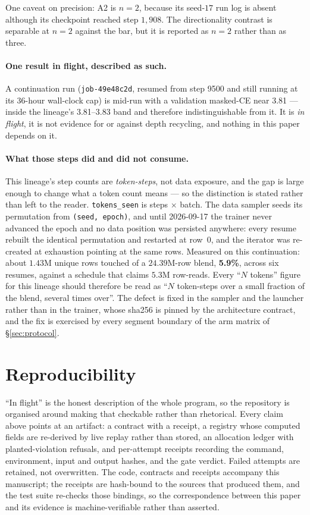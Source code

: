 \documentclass[11pt]{article}
\begin{document}
One caveat on precision: A2 is $n = 2$, because its seed-$17$ run log is absent although its
checkpoint reached step $1{,}908$. The directionality contrast is separable at $n = 2$
against the bar, but it is reported as $n = 2$ rather than as three.

\paragraph{One result in flight, described as such.} A continuation run
(\texttt{job-49e48c2d}, resumed from step 9500 and still running at its 36-hour
wall-clock cap) is mid-run with a validation masked-CE near 3.81 --- inside the lineage's
3.81--3.83 band and therefore indistinguishable from it. It is \emph{in flight}, it is
not evidence for or against depth recycling, and nothing in this paper depends on it.

\paragraph{What those steps did and did not consume.} This lineage's step counts are
\emph{token-steps}, not data exposure, and the gap is large enough to change what a
token count means --- so the distinction is stated rather than left to the reader.
\texttt{tokens\_seen} is steps $\times$ batch. The data sampler seeds its permutation
from \texttt{(seed, epoch)}, and until 2026-09-17 the trainer never advanced the epoch
and no data position was persisted anywhere: every resume rebuilt the identical
permutation and restarted at row~0, and the iterator was re-created at exhaustion
pointing at the same rows. Measured on this continuation: about $1.43$M unique rows
touched of a $24.39$M-row blend, \textbf{5.9\%}, across six resumes, against a schedule
that claims $5.3$M row-reads. Every ``$N$ tokens'' figure for this lineage should
therefore be read as ``$N$ token-steps over a small fraction of the blend, several
times over''. The defect is fixed in the sampler and the launcher rather than in the
trainer, whose sha256 is pinned by the architecture contract, and the fix is exercised
by every segment boundary of the arm matrix of \S\ref{sec:protocol}.

\section{Reproducibility}

``In flight'' is the honest description of the whole program, so the repository is
organised around making that checkable rather than rhetorical. Every claim above points
at an artifact: a contract with a receipt, a registry whose computed fields are
re-derived by live replay rather than stored, an allocation ledger with planted-violation
refusals, and per-attempt receipts recording the command, environment, input and output
hashes, and the gate verdict. Failed attempts are retained, not overwritten. The code,
contracts and receipts accompany this manuscript; the receipts are hash-bound to the
sources that produced them, and the test suite re-checks those bindings, so the
correspondence between this paper and its evidence is machine-verifiable rather than
asserted.
\end{document}
